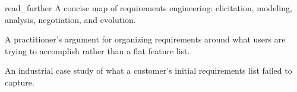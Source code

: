 \begin{bookbox}{read_further}{} %
\citep{nuseibeh2000roadmap} A concise map of requirements engineering: elicitation, modeling, analysis, negotiation, and evolution.

\citep{patton2008backlogmap} A practitioner's argument for organizing requirements around what users are trying to accomplish rather than a flat feature list.

\citep{kostova2019canvas} An industrial case study of what a customer's initial requirements list failed to capture.
\end{bookbox}
